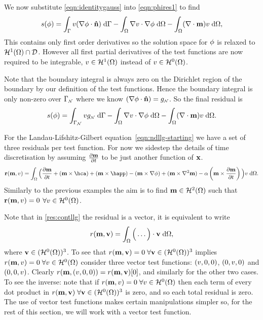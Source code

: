We now substitute \eqref{eqn:identitygauss} into \eqref{eqn:phires1} to find
\begin{equation}
  s(\phi) = {\int_{{\Gamma}}  v (\nabla \phi \cdot \mathbf{\hat{n}})  {\; \text{d}} {{\Gamma}}}
  - {\int_{\Omega}  \nabla v \cdot \nabla \phi  {\; \text{d}} {\Omega}}
  - {\int_{\Omega}  (\nabla \cdot \mathbf{m}) v  {\; \text{d}} {\Omega}},
\end{equation}
This contains only first order derivatives so the solution space for $\phi$ is relaxed to $\mathcal{H}^1(\Omega) \cap \mathcal{D}$. 
However all first partial derivatives of the test functions are now required to be integrable, \ie $v \in \mathcal{H}^1(\Omega)$ instead of $v \in \mathcal{H}^0(\Omega)$.

Note that the boundary integral is always zero on the Dirichlet region of the boundary by our definition of the test functions. 
Hence the boundary integral is only non-zero over ${\Gamma}_{{\scriptscriptstyle{\mathcal{N}}}}$ where we know $(\nabla \phi \cdot \mathbf{\hat{n}}) = g_{{\scriptscriptstyle{\mathcal{N}}}}$.
So the final residual is
\begin{equation}
  s(\phi) = \int_{{\Gamma}_{\scriptscriptstyle{\mathcal{N}}}} v g_{\scriptscriptstyle{\mathcal{N}}} {\; \text{d}} {\Gamma}
  - {\int_{\Omega}  \nabla v \cdot \nabla \phi {\; \text{d}} {\Omega}}
  - {\int_{\Omega}  (\nabla \cdot \mathbf{m}) v {\; \text{d}} {\Omega}}.
  \label{res:contphi}
\end{equation}


For the Landau-Lifshitz-Gilbert equation~\eqref{eqn:ndllg-starting} we have a set of three residuals per test function. 
For now we sidestep the details of time discretisation by assuming $\frac{\partial \mathbf{m}}{\partial t}$ to be just another function of $\mathbf{x}$.
\begin{equation}
  \rllgv(\mv, \test) = \int_\magd \Big( \dmdt
  + (\mv \times \hca) + (\mv \times \happ) \\
  - (\mv \times \nabla \phi) + (\mv \times \lap \mv)
  - \dampc \left( \mv \times \dmdt \right)
  \Big) \test \d\magd
  . \label{res:contllg}
\end{equation}
Similarly to the previous examples the aim is to find $\mathbf{m} \in \mathcal{H}^2(\Omega)$ such that $\mathbf{r}(\mathbf{m}, v) = 0$ $\forall v \in \mathcal{H}^0(\Omega)$.

Note that in \eqref{res:contllg} the residual is a vector, it is equivalent to write
\begin{equation}
  r(\mathbf{m}, \mathbf{v}) = \int_\Omega \Big( \ldots  \Big) \cdot \mathbf{v} {\; \text{d}}\Omega,
\end{equation}
where $\mathbf{v} \in (\mathcal{H}^0(\Omega))^3$.
To see that $r(\mathbf{m}, \mathbf{v}) = 0\; \forall \mathbf{v} \in (\mathcal{H}^0(\Omega))^3$ implies $r(\mathbf{m}, v) = 0 \; \forall v \in \mathcal{H}^0(\Omega)$ consider three vector test functions: $(v, 0, 0)$, $(0, v, 0)$ and $(0, 0, v)$.
Clearly $r(\mathbf{m}, (v, 0, 0)) = r(\mathbf{m}, \mathbf{v})[0]$, and similarly for the other two cases.
To see the inverse: note that if $r(\mathbf{m}, v) = 0\; \forall v \in \mathcal{H}^0(\Omega)$ then each term of every dot product in $r(\mathbf{m}, \mathbf{v}) \; \forall \mathbf{v} \in (\mathcal{H}^0(\Omega))^3$ is zero, and so each total residual is zero.
The use of vector test functions makes certain manipulations simpler so, for the rest of this section, we will work with a vector test function.

